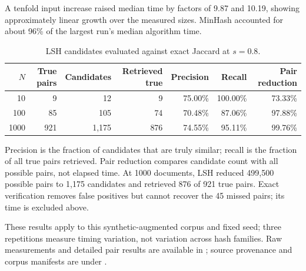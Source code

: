 \documentclass[11pt,a4paper]{article}
\begin{document}
A tenfold input increase raised median time by factors of 9.87 and 10.19,
showing approximately linear growth over the measured sizes. MinHash
accounted for about 96\% of the largest run's median algorithm time.

\begin{table}[htbp]
\centering\small
\caption{LSH candidates evaluated against exact Jaccard at $s=0.8$.}
\label{tab:quality}
\begin{tabular}{@{}rrrrrrr@{}}
\toprule
$N$ & True pairs & Candidates & Retrieved true & Precision & Recall & Pair reduction \\
\midrule
10 & 9 & 12 & 9 & 75.00\% & 100.00\% & 73.33\% \\
100 & 85 & 105 & 74 & 70.48\% & 87.06\% & 97.88\% \\
1000 & 921 & 1,175 & 876 & 74.55\% & 95.11\% & 99.76\% \\
\bottomrule
\end{tabular}
\end{table}

Precision is the fraction of candidates that are truly similar; recall
is the fraction of all true pairs retrieved. Pair reduction compares
candidate count with all possible pairs, not elapsed time. At 1000
documents, LSH reduced 499,500 possible pairs to 1,175 candidates and
retrieved 876 of 921 true pairs. Exact verification removes false positives
but cannot recover the 45 missed pairs; its time is excluded above.

These results apply to this synthetic-augmented corpus and fixed seed;
three repetitions measure timing variation, not variation across hash
families. Raw measurements and detailed pair results are available in
; source provenance and corpus manifests are
under .
\end{document}
